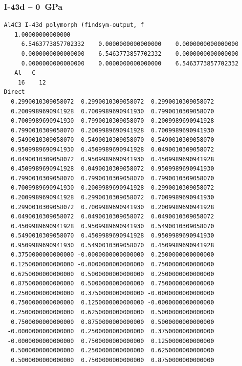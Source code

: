 \subsubsection*{I-43d -- 0~GPa}
\begin{footnotesize}
\begin{verbatim}
Al4C3 I-43d polymorph (findsym-output, f
   1.00000000000000     
     6.5463773857702332    0.0000000000000000    0.0000000000000000
     0.0000000000000000    6.5463773857702332    0.0000000000000000
     0.0000000000000000    0.0000000000000000    6.5463773857702332
   Al   C 
    16    12
Direct
  0.2990010309058072  0.2990010309058072  0.2990010309058072
  0.2009989690941928  0.7009989690941930  0.7990010309058070
  0.7009989690941930  0.7990010309058070  0.2009989690941928
  0.7990010309058070  0.2009989690941928  0.7009989690941930
  0.5490010309058070  0.5490010309058070  0.5490010309058070
  0.9509989690941930  0.4509989690941928  0.0490010309058072
  0.0490010309058072  0.9509989690941930  0.4509989690941928
  0.4509989690941928  0.0490010309058072  0.9509989690941930
  0.7990010309058070  0.7990010309058070  0.7990010309058070
  0.7009989690941930  0.2009989690941928  0.2990010309058072
  0.2009989690941928  0.2990010309058072  0.7009989690941930
  0.2990010309058072  0.7009989690941930  0.2009989690941928
  0.0490010309058072  0.0490010309058072  0.0490010309058072
  0.4509989690941928  0.9509989690941930  0.5490010309058070
  0.5490010309058070  0.4509989690941928  0.9509989690941930
  0.9509989690941930  0.5490010309058070  0.4509989690941928
  0.3750000000000000 -0.0000000000000000  0.2500000000000000
  0.1250000000000000 -0.0000000000000000  0.7500000000000000
  0.6250000000000000  0.5000000000000000  0.2500000000000000
  0.8750000000000000  0.5000000000000000  0.7500000000000000
  0.2500000000000000  0.3750000000000000 -0.0000000000000000
  0.7500000000000000  0.1250000000000000 -0.0000000000000000
  0.2500000000000000  0.6250000000000000  0.5000000000000000
  0.7500000000000000  0.8750000000000000  0.5000000000000000
 -0.0000000000000000  0.2500000000000000  0.3750000000000000
 -0.0000000000000000  0.7500000000000000  0.1250000000000000
  0.5000000000000000  0.2500000000000000  0.6250000000000000
  0.5000000000000000  0.7500000000000000  0.8750000000000000
 

\end{verbatim}
\end{footnotesize}

